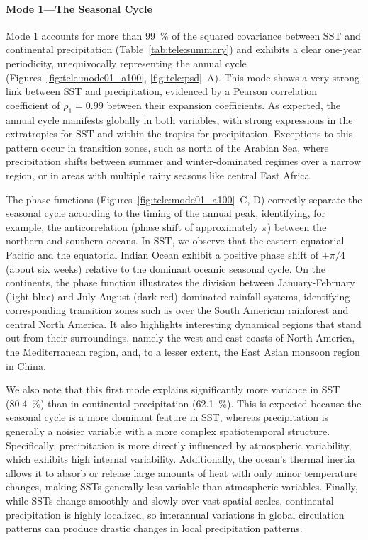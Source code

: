 \paragraph{Mode 1---The Seasonal Cycle} 
Mode 1 accounts for more than \qty{99}{\percent} of the squared covariance between SST and continental precipitation (Table~\ref{tab:tele:summary}) and exhibits a clear one-year periodicity, unequivocally representing the annual cycle (Figures~\ref{fig:tele:mode01_a100}, \ref{fig:tele:psd}~A). This mode shows a very strong link between SST and precipitation, evidenced by a Pearson correlation coefficient of $\rho_{1}=0.99$ between their expansion coefficients. As expected, the annual cycle manifests globally in both variables, with strong expressions in the extratropics for SST and within the tropics for precipitation. Exceptions to this pattern occur in transition zones, such as north of the Arabian Sea, where precipitation shifts between summer and winter-dominated regimes over a narrow region, or in areas with multiple rainy seasons like central East Africa.

The phase functions (Figures~\ref{fig:tele:mode01_a100}~C, D) correctly separate the seasonal cycle according to the timing of the annual peak, identifying, for example, the anticorrelation (phase shift of approximately $\pi$) between the northern and southern oceans. In SST, we observe that the eastern equatorial Pacific and the equatorial Indian Ocean exhibit a positive phase shift of $+\pi/4$ (about six weeks) relative to the dominant oceanic seasonal cycle. On the continents, the phase function illustrates the division between January-February (light blue) and July-August (dark red) dominated rainfall systems, identifying corresponding transition zones such as over the South American rainforest and central North America. It also highlights interesting dynamical regions that stand out from their surroundings, namely the west and east coasts of North America, the Mediterranean region, and, to a lesser extent, the East Asian monsoon region in China.

We also note that this first mode explains significantly more variance in SST (\qty{80.4}{\percent}) than in continental precipitation (\qty{62.1}{\percent}). This is expected because the seasonal cycle is a more dominant feature in SST, whereas precipitation is generally a noisier variable with a more complex spatiotemporal structure. Specifically, precipitation is more directly influenced by atmospheric variability, which exhibits high internal variability. Additionally, the ocean's thermal inertia allows it to absorb or release large amounts of heat with only minor temperature changes, making SSTs generally less variable than atmospheric variables. Finally, while SSTs change smoothly and slowly over vast spatial scales, continental precipitation is highly localized, so interannual variations in global circulation patterns can produce drastic changes in local precipitation patterns.


